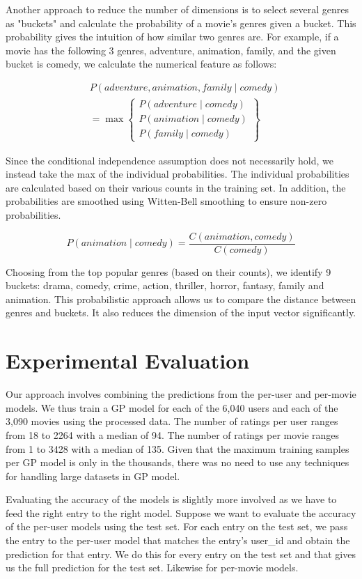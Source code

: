 \documentclass[letterpaper]{article}
\begin{document}
Another approach to reduce the number of dimensions is to select several genres as "buckets" and calculate the probability of a movie's genres given a bucket.
This probability gives the intuition of how similar two genres are.
For example, if a movie has the following 3 genres, adventure, animation, family, and the given bucket is comedy, we calculate the numerical feature as follows:

\begin{align*}
    &P(adventure, animation, family \mid comedy)\\
    &= \max \begin{Bmatrix} P(adventure \mid comedy)
    \\P(animation \mid comedy) 
    \\P(family \mid comedy)
    \end{Bmatrix}
\end{align*}

Since the conditional independence assumption does not necessarily hold, we instead take the max of the individual probabilities. 
The individual probabilities are calculated based on their various counts in the training set. 
In addition, the probabilities are smoothed using Witten-Bell smoothing to ensure non-zero probabilities.

$$ P(animation \mid comedy) = \frac{C(animation, comedy)}{C(comedy)} $$

Choosing from the top popular genres (based on their counts), we identify 9 buckets: drama, comedy, crime, action, thriller, horror, fantasy, family and animation.
This probabilistic approach allows us to compare the distance between genres and buckets. It also reduces the dimension of the input vector significantly.

\section{Experimental Evaluation}
Our approach involves combining the predictions from the per-user and per-movie models.
We thus train a GP model for each of the 6,040 users and each of the 3,090 movies using the processed data.
The number of ratings per user ranges from 18 to 2264 with a median of 94. The number of ratings per movie ranges from 1 to 3428 with a median of 135.
Given that the maximum training samples per GP model is only in the thousands, there was no need to use any techniques for handling large datasets in GP model.

Evaluating the accuracy of the models is slightly more involved as we have to feed the right entry to the right model.
Suppose we want to evaluate the accuracy of the per-user models using the test set. For each entry on the test set,
we pass the entry to the per-user model that matches the entry's user\_id and obtain the prediction for that entry.
We do this for every entry on the test set and that gives us the full prediction for the test set. Likewise for per-movie models.
\end{document}
